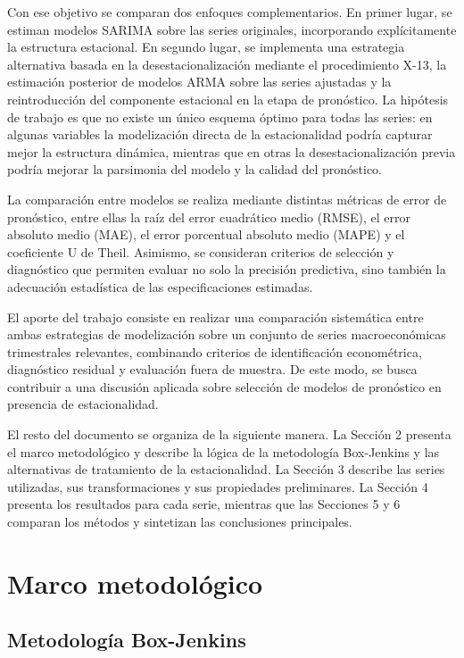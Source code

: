 \documentclass[11pt]{article}
\begin{document}
Con ese objetivo se comparan dos enfoques complementarios. En primer lugar, se estiman modelos SARIMA sobre las series originales, incorporando explícitamente la estructura estacional. En segundo lugar, se implementa una estrategia alternativa basada en la desestacionalización mediante el procedimiento X-13, la estimación posterior de modelos ARMA sobre las series ajustadas y la reintroducción del componente estacional en la etapa de pronóstico. La hipótesis de trabajo es que no existe un único esquema óptimo para todas las series: en algunas variables la modelización directa de la estacionalidad podría capturar mejor la estructura dinámica, mientras que en otras la desestacionalización previa podría mejorar la parsimonia del modelo y la calidad del pronóstico.

La comparación entre modelos se realiza mediante distintas métricas de error de pronóstico, entre ellas la raíz del error cuadrático medio (RMSE), el error absoluto medio (MAE), el error porcentual absoluto medio (MAPE) y el coeficiente U de Theil. Asimismo, se consideran criterios de selección y diagnóstico que permiten evaluar no solo la precisión predictiva, sino también la adecuación estadística de las especificaciones estimadas.

El aporte del trabajo consiste en realizar una comparación sistemática entre ambas estrategias de modelización sobre un conjunto de series macroeconómicas trimestrales relevantes, combinando criterios de identificación econométrica, diagnóstico residual y evaluación fuera de muestra. De este modo, se busca contribuir a una discusión aplicada sobre selección de modelos de pronóstico en presencia de estacionalidad.

El resto del documento se organiza de la siguiente manera. La Sección 2 presenta el marco metodológico y describe la lógica de la metodología Box-Jenkins y las alternativas de tratamiento de la estacionalidad. La Sección 3 describe las series utilizadas, sus transformaciones y sus propiedades preliminares. La Sección 4 presenta los resultados para cada serie, mientras que las Secciones 5 y 6 comparan los métodos y sintetizan las conclusiones principales.

\section{Marco metodológico}

\subsection{Metodología Box-Jenkins}
\end{document}
